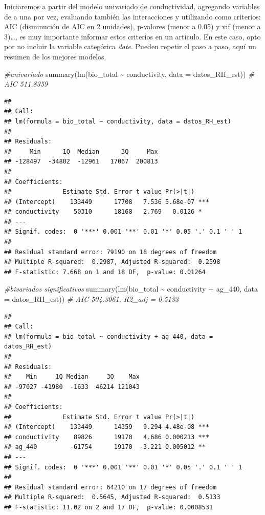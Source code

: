 \documentclass[
]{book}
\newenvironment{Shaded}{\begin{snugshade}}{\end{snugshade}}
\newcommand{\AttributeTok}[1]{\textcolor[rgb]{0.77,0.63,0.00}{#1}}
\newcommand{\CommentTok}[1]{\textcolor[rgb]{0.56,0.35,0.01}{\textit{#1}}}
\newcommand{\FunctionTok}[1]{\textcolor[rgb]{0.00,0.00,0.00}{#1}}
\newcommand{\NormalTok}[1]{#1}
\newcommand{\SpecialCharTok}[1]{\textcolor[rgb]{0.00,0.00,0.00}{#1}}
\begin{document}
Iniciaremos a partir del modelo univariado de conductividad, agregando variables de a una por vez, evaluando también las interacciones y utilizando como criterios: AIC (disminución de AIC en 2 unidades), p-valores (menor a 0.05) y vif (menor a 3)\ldots, es muy importante informar estos criterios en un artículo. En este caso, opto por no incluir la variable categórica \emph{date}. Pueden repetir el paso a paso, aquí un resumen de los mejores modelos.

\begin{Shaded}
\begin{Highlighting}[]
\CommentTok{\#univariado}
\FunctionTok{summary}\NormalTok{(}\FunctionTok{lm}\NormalTok{(bio\_total }\SpecialCharTok{\textasciitilde{}}\NormalTok{ conductivity, }\AttributeTok{data =}\NormalTok{ datos\_RH\_est)) }\CommentTok{\# AIC 511.8359}
\end{Highlighting}
\end{Shaded}

\begin{verbatim}
## 
## Call:
## lm(formula = bio_total ~ conductivity, data = datos_RH_est)
## 
## Residuals:
##     Min      1Q  Median      3Q     Max 
## -128497  -34802  -12961   17067  200813 
## 
## Coefficients:
##              Estimate Std. Error t value Pr(>|t|)    
## (Intercept)    133449      17708   7.536 5.68e-07 ***
## conductivity    50310      18168   2.769   0.0126 *  
## ---
## Signif. codes:  0 '***' 0.001 '**' 0.01 '*' 0.05 '.' 0.1 ' ' 1
## 
## Residual standard error: 79190 on 18 degrees of freedom
## Multiple R-squared:  0.2987, Adjusted R-squared:  0.2598 
## F-statistic: 7.668 on 1 and 18 DF,  p-value: 0.01264
\end{verbatim}

\begin{Shaded}
\begin{Highlighting}[]
\CommentTok{\#bivariados significativos}
\FunctionTok{summary}\NormalTok{(}\FunctionTok{lm}\NormalTok{(bio\_total }\SpecialCharTok{\textasciitilde{}}\NormalTok{ conductivity }\SpecialCharTok{+}\NormalTok{ ag\_440, }\AttributeTok{data =}\NormalTok{ datos\_RH\_est)) }\CommentTok{\# AIC 504.3061, R2\_adj = 0.5133 }
\end{Highlighting}
\end{Shaded}

\begin{verbatim}
## 
## Call:
## lm(formula = bio_total ~ conductivity + ag_440, data = datos_RH_est)
## 
## Residuals:
##    Min     1Q Median     3Q    Max 
## -97027 -41980  -1633  46214 121043 
## 
## Coefficients:
##              Estimate Std. Error t value Pr(>|t|)    
## (Intercept)    133449      14359   9.294 4.48e-08 ***
## conductivity    89826      19170   4.686 0.000213 ***
## ag_440         -61754      19170  -3.221 0.005012 ** 
## ---
## Signif. codes:  0 '***' 0.001 '**' 0.01 '*' 0.05 '.' 0.1 ' ' 1
## 
## Residual standard error: 64210 on 17 degrees of freedom
## Multiple R-squared:  0.5645, Adjusted R-squared:  0.5133 
## F-statistic: 11.02 on 2 and 17 DF,  p-value: 0.0008531
\end{verbatim}
\end{document}
